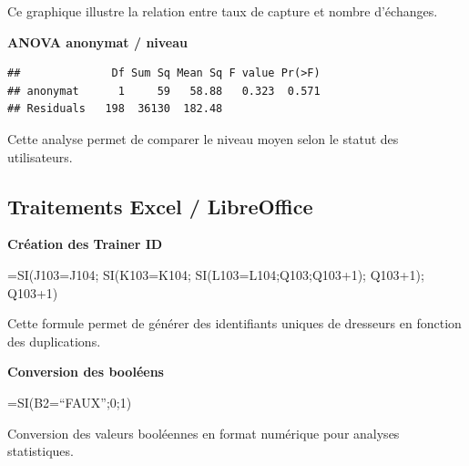 \documentclass[mstat,12pt]{unswthesis}
\newenvironment{Shaded}{\begin{snugshade}}{\end{snugshade}}
\newcommand{\AttributeTok}[1]{\textcolor[rgb]{0.13,0.29,0.53}{#1}}
\newcommand{\DecValTok}[1]{\textcolor[rgb]{0.00,0.00,0.81}{#1}}
\newcommand{\FunctionTok}[1]{\textcolor[rgb]{0.13,0.29,0.53}{\textbf{#1}}}
\newcommand{\NormalTok}[1]{#1}
\newcommand{\OtherTok}[1]{\textcolor[rgb]{0.56,0.35,0.01}{#1}}
\newcommand{\SpecialCharTok}[1]{\textcolor[rgb]{0.81,0.36,0.00}{\textbf{#1}}}
\newcommand{\StringTok}[1]{\textcolor[rgb]{0.31,0.60,0.02}{#1}}
\begin{document}
Ce graphique illustre la relation entre taux de capture et nombre
d'échanges.

\textbf{ANOVA anonymat / niveau}

\begin{Shaded}
\end{Shaded}

\begin{verbatim}
##              Df Sum Sq Mean Sq F value Pr(>F)
## anonymat      1     59   58.88   0.323  0.571
## Residuals   198  36130  182.48
\end{verbatim}

Cette analyse permet de comparer le niveau moyen selon le statut des
utilisateurs.

\subsection{Traitements Excel /
LibreOffice}\label{traitements-excel-libreoffice}

\textbf{Création des Trainer ID}

=SI(J103=J104; SI(K103=K104; SI(L103=L104;Q103;Q103+1); Q103+1); Q103+1)

Cette formule permet de générer des identifiants uniques de dresseurs en
fonction des duplications.

\textbf{Conversion des booléens}

=SI(B2=``FAUX'';0;1)

Conversion des valeurs booléennes en format numérique pour analyses
statistiques.
\end{document}
